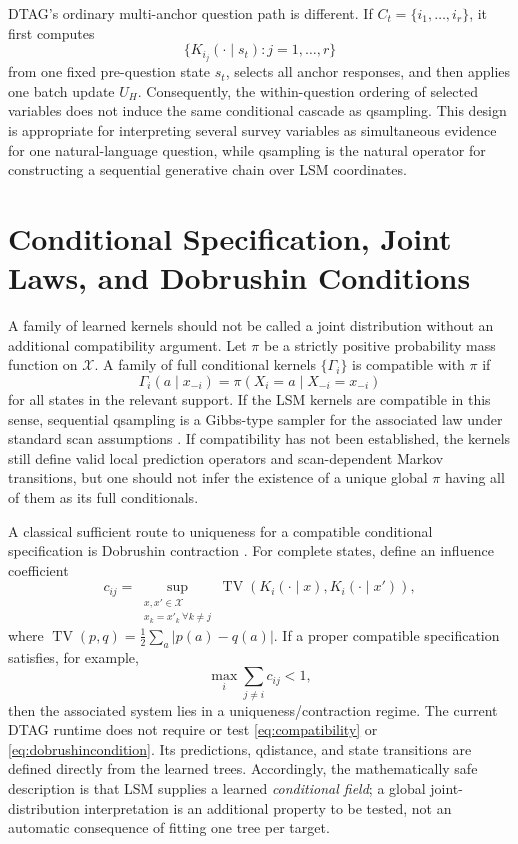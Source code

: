 \documentclass[journal]{IEEEtran}
\DeclareMathOperator{\TV}{TV}
\newcommand{\X}{\mathcal{X}}
\newcommand{\1}{\mathbf{1}}
\begin{document}
DTAG's ordinary multi-anchor question path is different. If $C_t=\{i_1,\ldots,i_r\}$, it first computes
\begin{equation}
  \{K_{i_j}(\cdot\mid s_t):j=1,\ldots,r\}
\end{equation}
from one fixed pre-question state $s_t$, selects all anchor responses, and then applies one batch update $U_H$. Consequently, the within-question ordering of selected variables does not induce the same conditional cascade as qsampling. This design is appropriate for interpreting several survey variables as simultaneous evidence for one natural-language question, while qsampling is the natural operator for constructing a sequential generative chain over LSM coordinates.

\section{Conditional Specification, Joint Laws, and Dobrushin Conditions}
\label{sec:joint}

A family of learned kernels should not be called a joint distribution without an additional compatibility argument. Let $\pi$ be a strictly positive probability mass function on $\X$. A family of full conditional kernels $\{\Gamma_i\}$ is compatible with $\pi$ if
\begin{equation}
  \Gamma_i(a\mid x_{-i})
  =\pi(X_i=a\mid X_{-i}=x_{-i})
  \label{eq:compatibility}
\end{equation}
for all states in the relevant support. If the LSM kernels are compatible in this sense, sequential qsampling is a Gibbs-type sampler for the associated law under standard scan assumptions \cite{geman1984gibbs}. If compatibility has not been established, the kernels still define valid local prediction operators and scan-dependent Markov transitions, but one should not infer the existence of a unique global $\pi$ having all of them as its full conditionals.

A classical sufficient route to uniqueness for a compatible conditional specification is Dobrushin contraction \cite{dobrushin1970conditional}. For complete states, define an influence coefficient
\begin{equation}
 c_{ij}=\sup_{\substack{x,x'\in\X\\x_k=x'_k\ \forall k\neq j}}
 \TV\!\left(K_i(\cdot\mid x),K_i(\cdot\mid x')\right),
 \label{eq:dobrushin}
\end{equation}
where $\TV(p,q)=\frac12\sum_a|p(a)-q(a)|$. If a proper compatible specification satisfies, for example,
\begin{equation}
  \max_i\sum_{j\neq i}c_{ij}<1,
  \label{eq:dobrushincondition}
\end{equation}
then the associated system lies in a uniqueness/contraction regime. The current DTAG runtime does not require or test \eqref{eq:compatibility} or \eqref{eq:dobrushincondition}. Its predictions, qdistance, and state transitions are defined directly from the learned trees. Accordingly, the mathematically safe description is that LSM supplies a learned \emph{conditional field}; a global joint-distribution interpretation is an additional property to be tested, not an automatic consequence of fitting one tree per target.
\end{document}
